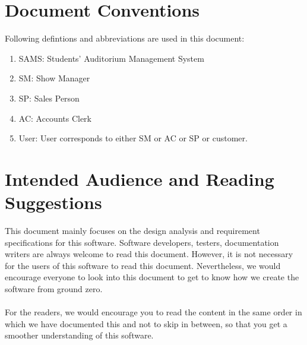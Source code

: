 \documentclass{scrreprt}
\begin{document}
\section{Document Conventions}

Following defintions and abbreviations are used in this document:
\begin{enumerate}
	\item SAMS: Students' Auditorium Management System
	\item SM: Show Manager
	\item SP: Sales Person
	\item AC: Accounts Clerk
	\item User: User corresponds to either SM or AC or SP or customer.
\end{enumerate}

\section{Intended Audience and Reading Suggestions}

This document mainly focuses on the design analysis and requirement specifications for this software. Software developers, testers, documentation writers are always welcome to read this document. However, it is not necessary for the users of this software to read this document. Nevertheless, we would encourage everyone to look into this document to get to know how we create the software from ground zero.
\\ \\
For the readers, we would encourage you to read the content in the same order in which we have documented this and not to skip in between, so that you get a smoother understanding of this software. 
\end{document}
